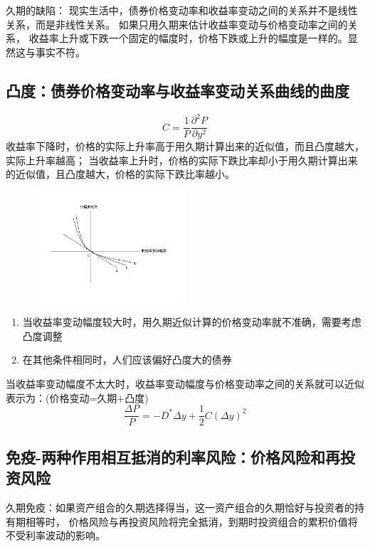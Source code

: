 \documentclass{article}
\begin{document}
久期的缺陷：
现实生活中，债券价格变动率和收益率变动之间的关系并不是线性关系，而是非线性关系。
如果只用久期来估计收益率变动与价格变动率之间的关系，
收益率上升或下跌一个固定的幅度时，价格下跌或上升的幅度是一样的。显然这与事实不符。
\clearpage



\subsection*{凸度：债券价格变动率与收益率变动关系曲线的曲度}
\[C=\frac{1}{P}\frac{\partial^2P}{\partial y^2}\]
收益率下降时，价格的实际上升率高于用久期计算出来的近似值，而且凸度越大，实际上升率越高；
当收益率上升时，价格的实际下跌比率却小于用久期计算出来的近似值，且凸度越大，价格的实际下跌比率越小。
\begin{figure}[H]
    \begin{center}
        \includegraphics[width=0.5\textwidth]{3.png}

    \end{center}
\end{figure}
\begin{enumerate}
    \item 当收益率变动幅度较大时，用久期近似计算的价格变动率就不准确，需要考虑凸度调整
    \item 在其他条件相同时，人们应该偏好凸度大的债券
\end{enumerate}
当收益率变动幅度不太大时，收益率变动幅度与价格变动率之间的关系就可以近似表示为：(价格变动=久期+凸度)
\[\frac{\Delta P}{P}=-D^*\Delta y+\frac{1}{2}C(\Delta y)^2\]

\subsection*{免疫-两种作用相互抵消的利率风险：价格风险和再投资风险}
久期免疫：如果资产组合的久期选择得当，这一资产组合的久期恰好与投资者的持有期相等时，
价格风险与再投资风险将完全抵消，到期时投资组合的累积价值将不受利率波动的影响。
\end{document}
